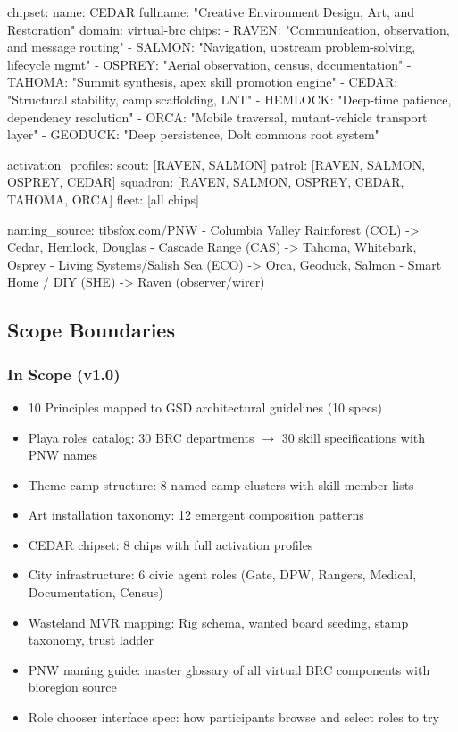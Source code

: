 \documentclass[11pt,letterpaper]{article}
\begin{document}
\begin{asciibox}
chipset:
  name: CEDAR
  fullname: "Creative Environment Design, Art, and Restoration"
  domain: virtual-brc
  chips:
    - RAVEN:   "Communication, observation, and message routing"
    - SALMON:  "Navigation, upstream problem-solving, lifecycle mgmt"
    - OSPREY:  "Aerial observation, census, documentation"
    - TAHOMA:  "Summit synthesis, apex skill promotion engine"
    - CEDAR:   "Structural stability, camp scaffolding, LNT"
    - HEMLOCK: "Deep-time patience, dependency resolution"
    - ORCA:    "Mobile traversal, mutant-vehicle transport layer"
    - GEODUCK: "Deep persistence, Dolt commons root system"

activation_profiles:
  scout:   [RAVEN, SALMON]
  patrol:  [RAVEN, SALMON, OSPREY, CEDAR]
  squadron: [RAVEN, SALMON, OSPREY, CEDAR, TAHOMA, ORCA]
  fleet:   [all chips]

naming_source: tibsfox.com/PNW
  - Columbia Valley Rainforest (COL) -> Cedar, Hemlock, Douglas
  - Cascade Range (CAS) -> Tahoma, Whitebark, Osprey
  - Living Systems/Salish Sea (ECO) -> Orca, Geoduck, Salmon
  - Smart Home / DIY (SHE) -> Raven (observer/wirer)
\end{asciibox}

\subsection{Scope Boundaries}

\subsubsection{In Scope (v1.0)}
\begin{itemize}[noitemsep]
  \item 10 Principles mapped to GSD architectural guidelines (10 specs)
  \item Playa roles catalog: 30 BRC departments $\to$ 30 skill specifications with PNW names
  \item Theme camp structure: 8 named camp clusters with skill member lists
  \item Art installation taxonomy: 12 emergent composition patterns
  \item CEDAR chipset: 8 chips with full activation profiles
  \item City infrastructure: 6 civic agent roles (Gate, DPW, Rangers, Medical, Documentation, Census)
  \item Wasteland MVR mapping: Rig schema, wanted board seeding, stamp taxonomy, trust ladder
  \item PNW naming guide: master glossary of all virtual BRC components with bioregion source
  \item Role chooser interface spec: how participants browse and select roles to try
\end{itemize}
\end{document}
